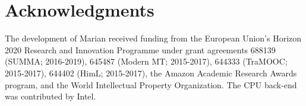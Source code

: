 \documentclass[11pt,a4paper]{article}
\begin{document}
\section*{Acknowledgments}

The development of Marian received funding from the European Union's Horizon 2020 Research and Innovation Programme under grant agreements 688139 (SUMMA; 2016-2019), 645487 (Modern MT; 2015-2017), 644333 (TraMOOC; 2015-2017), 644402 (HimL; 2015-2017), the Amazon Academic Research Awards program, and the World Intellectual Property Organization. The CPU back-end was contributed by Intel. 



\end{document}
